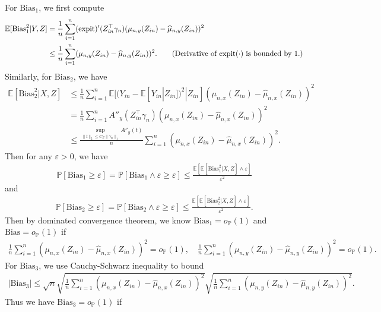 \documentclass[12pt]{article}
\theoremstyle{definition}
\def\P{\mathbb{P}}
\def\P{\mathbb{P}}
\newcommand{\E}{\mathbb E}								%
\renewcommand{\P}{\mathbb{P}}							%
\newcommand{\expit}{\mathrm{expit}}                 	%
\newcommand{\srx}{X}									%
\newcommand{\srz}{Z}									%
\newcommand{\sry}{Y}									%
\begin{document}
For $\mathrm{Bias}_1$, we first compute
\begin{align*}
  \E[\mathrm{Bias}_1^2|\sry,\srz]
  &
  =\frac{1}{n}\sum_{i=1}^n(\expit)'(\srz_{in}^\top\gamma_n)(\mu_{n,y}(\srz_{in})-\widehat{\mu}_{n,y}(\srz_{in}))^2\\
  &
  \leq \frac{1}{n}\sum_{i=1}^n(\mu_{n,y}(\srz_{in})-\widehat{\mu}_{n,y}(\srz_{in}))^2.\tag{Derivative of $\expit(\cdot)$ is bounded by $1$.}
\end{align*}
Similarly, for $\mathrm{Bias}_2$, we have 
\begin{align*}
  \E[\mathrm{Bias}_2^2|\srx,\srz]
  &
  \leq \frac{1}{n}\sum_{i=1}^n \E[(\sry_{in}-\E[\sry_{in}|\srz_{in}])^2|\srz_{in}](\mu_{n,x}(\srz_{in})-\widehat{\mu}_{n,x}(\srz_{in}))^2\\
  &
  =\frac{1}{n}\sum_{i=1}^n A''_y(\srz_{in}^\top\gamma_n)(\mu_{n,x}(\srz_{in})-\widehat{\mu}_{n,x}(\srz_{in}))^2\\
  &
  \leq \frac{\sup_{\|t\|_2\leq C_Z\|\gamma_n\|_1}A''_y(t)}{n}\sum_{i=1}^n(\mu_{n,x}(\srz_{in})-\widehat{\mu}_{n,x}(\srz_{in}))^2\tag{By H\"older's inequality}.
\end{align*}
Then for any $\varepsilon>0$, we have 
\begin{align*}
	\P[\mathrm{Bias}_1 \geq \varepsilon]=\P[\mathrm{Bias}_1\wedge \varepsilon \geq \varepsilon]\leq \frac{\E[\E[\mathrm{Bias}_1^2|\srx,\srz]\wedge \varepsilon]}{\varepsilon^2}
\end{align*}
and 
\begin{align*}
	\P[\mathrm{Bias}_2\geq \varepsilon]=\P[\mathrm{Bias}_2\wedge \varepsilon \geq \varepsilon]\leq \frac{\E[\E[\mathrm{Bias}_2^2|\srx,\srz]\wedge \varepsilon]}{\varepsilon^2}.
\end{align*}
Then by dominated convergence theorem, we know $\mathrm{Bias}_1=o_\P(1)$ and $\mathrm{Bias}=o_\P(1)$ if
\begin{align}\label{eq:estimation_error_hd_glm}
  \frac{1}{n}\sum_{i=1}^n(\mu_{n,x}(\srz_{in})-\widehat{\mu}_{n,x}(\srz_{in}))^2=o_\P(1),\quad \frac{1}{n}\sum_{i=1}^n(\mu_{n,y}(\srz_{in})-\widehat{\mu}_{n,y}(\srz_{in}))^2=o_\P(1).
\end{align}
For $\mathrm{Bias}_3$, we use Cauchy-Schwarz inequality to bound
\begin{align*}
  |\mathrm{Bias}_3|\leq \sqrt{n}\sqrt{\frac{1}{n}\sum_{i=1}^n(\mu_{n,x}(\srz_{in})-\widehat{\mu}_{n,x}(\srz_{in}))^2}\sqrt{\frac{1}{n}\sum_{i=1}^n(\mu_{n,y}(\srz_{in})-\widehat{\mu}_{n,y}(\srz_{in}))^2}.
\end{align*}
Thus we have $\mathrm{Bias}_3=o_\P(1)$ if 
\end{document}
